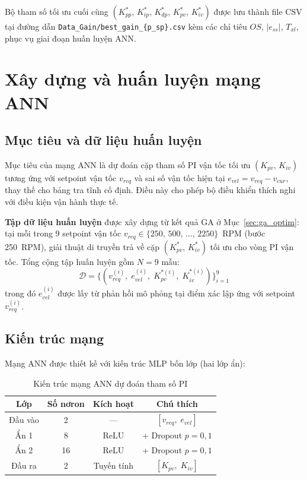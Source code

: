 Bộ tham số tối ưu cuối cùng
$(K_{pp}^*,\,K_{ip}^*,\,K_{dp}^*,\,K_{pv}^*,\,K_{iv}^*)$
được lưu thành file CSV tại đường dẫn
\texttt{Data\_Gain/best\_gain\_\{p\_sp\}.csv} kèm các chỉ tiêu
$OS$, $|e_{ss}|$, $T_{xl}$, phục vụ giai đoạn huấn luyện ANN.


\section{Xây dựng và huấn luyện mạng ANN}
\label{sec:ann_train}

\subsection{Mục tiêu và dữ liệu huấn luyện}

Mục tiêu của mạng ANN là dự đoán cặp tham số PI vận tốc tối ưu
$(K_{pv},\,K_{iv})$ tương ứng với setpoint vận tốc $v_{req}$ và sai số
vận tốc hiện tại $e_{vel} = v_{req} - v_{cur}$, thay thế cho bảng tra tĩnh
cố định. Điều này cho phép bộ điều khiển thích nghi với điều kiện vận hành
thực tế.

\textbf{Tập dữ liệu huấn luyện} được xây dựng từ kết quả GA ở
Mục~\ref{sec:ga_optim}: tại mỗi trong 9 setpoint vận tốc
$v_{req} \in \{250,\, 500,\, \ldots,\, 2250\}$~RPM (bước 250~RPM),
giải thuật di truyền trả về cặp $(K_{pv}^*,\, K_{iv}^*)$ tối ưu cho
vòng PI vận tốc. Tổng cộng tập huấn luyện gồm $N = 9$ mẫu:
\begin{equation}
    \mathcal{D} = \bigl\{(v_{req}^{(i)},\; e_{vel}^{(i)},\;
                          K_{pv}^{*(i)},\; K_{iv}^{*(i)})\bigr\}_{i=1}^{9}
    \label{eq:ann_dataset}
\end{equation}
trong đó $e_{vel}^{(i)}$ được lấy từ phản hồi mô phỏng tại điểm xác lập
ứng với setpoint $v_{req}^{(i)}$.

\subsection{Kiến trúc mạng}

Mạng ANN được thiết kế với kiến trúc MLP bốn lớp (hai lớp ẩn):

\begin{table}[H]
    \centering
    \caption{Kiến trúc mạng ANN dự đoán tham số PI}
    \label{tab:ann_arch}
    \renewcommand{\arraystretch}{1.3}
    \begin{tabular}{|c|c|c|c|}
    \hline
    \textbf{Lớp} & \textbf{Số nơron} & \textbf{Kích hoạt} & \textbf{Chú thích} \\
    \hline
    Đầu vào   & 2  & —    & $[v_{req},\; e_{vel}]$ \\
    Ẩn 1      & 8  & ReLU & + Dropout $p = 0{,}1$ \\
    Ẩn 2      & 16 & ReLU & + Dropout $p = 0{,}1$ \\
    Đầu ra    & 2  & Tuyến tính & $[K_{pv},\; K_{iv}]$ \\
    \hline
    \end{tabular}
\end{table}

